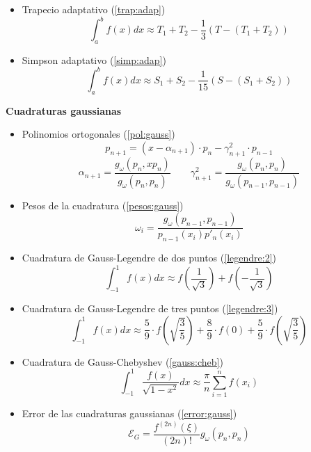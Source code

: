 \begin{itemize}
    \item Trapecio adaptativo (\ref{trap:adap})
$$\int_a^bf(x)dx\approx T_1+T_2-\dfrac{1}{3}(T-(T_1+T_2))$$
    \item Simpson adaptativo (\ref{simp:adap})
    $$\int_a^bf(x)dx\approx S_1+S_2-\dfrac{1}{15}(S-(S_1+S_2))$$
\end{itemize}
\textbf{Cuadraturas gaussianas}
\begin{itemize}
    \item Polinomios ortogonales (\ref{pol:gauss})
    $$p_{n+1}=\left(x-\alpha_{n+1}\right)\cdot p_n- \gamma_{n+1}^2\cdot p_{n-1}$$
    $$\alpha_{n+1}=\dfrac{g_{\omega}(p_n,xp_n)}{g_{\omega}(p_{n},p_{n})}\qquad \gamma_{n+1}^2=\dfrac{g_{\omega}(p_n,p_n)}{g_{\omega}(p_{n-1},p_{n-1})}$$
    \item Pesos de la cuadratura (\ref{pesos:gauss})
    $$\omega_i=\dfrac{g_{\omega}(p_{n-1},p_{n-1})}{p_{n-1}(x_i)p'_n(x_i)} $$
    \item Cuadratura de Gauss-Legendre de dos puntos (\ref{legendre:2})
    $$\int_{-1}^1f(x)dx\approx f\left(\dfrac{1}{\sqrt{3}}\right)+f\left(-\dfrac{1}{\sqrt{3}}\right)$$
    \item Cuadratura de Gauss-Legendre de tres puntos (\ref{legendre:3})
    $$\int_{-1}^1f(x)dx\approx\dfrac{5}{9}\cdot f\left(\sqrt{\dfrac{3}{5}}\right)+ \dfrac{8}{9}\cdot f(0)+\dfrac{5}{9}\cdot f\left(\sqrt{\dfrac{3}{5}}\right) $$
    \item Cuadratura de Gauss-Chebyshev (\ref{gauss:cheb})
    $$ \int_{-1}^1\dfrac{f(x)}{\sqrt{1-x^2}}dx\approx\dfrac{\pi}{n}\sum_{i=1}^nf(x_i)$$
    \item Error de las cuadraturas gaussianas (\ref{error:gauss})
    $$\mathcal{E}_G=\dfrac{f^{(2n)}(\xi)}{(2n)!}g_{\omega}(p_n,p_n)$$
    
\end{itemize}
